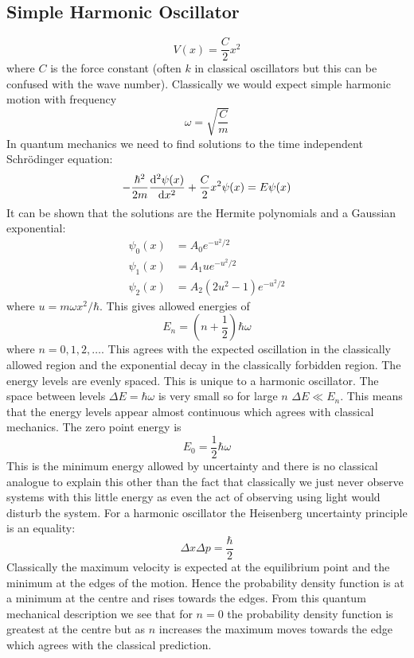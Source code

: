 \documentclass{article}
\begin{document}
    \subsection{Simple Harmonic Oscillator}
    \[V(x) = \frac{C}{2}x^2\]
    where \(C\) is the force constant (often \(k\) in classical oscillators but this can be confused with the wave number).
    Classically we would expect simple harmonic motion with frequency
    \[\omega = \sqrt{\frac{C}{m}}\]
    In quantum mechanics we need to find solutions to the time independent Schr\"odinger equation:
    \[-\frac{\hbar^2}{2m}\dv[2]{\psi(x)}{x} + \frac{C}{2}x^2\psi(x) = E\psi(x)\]
    It can be shown that the solutions are the Hermite polynomials and a Gaussian exponential:
    \begin{align*}
        \psi_0(x) &= A_0 e^{-u^2/2}\\
        \psi_1(x) &= A_1 u e^{-u^2/2}\\
        \psi_2(x) &= A_2 (2u^2 - 1) e^{-u^2/2}
    \end{align*}
    where \(u = m\omega x^2 / \hbar\).
    This gives allowed energies of
    \[E_n = \left(n + \frac{1}{2}\right)\hbar \omega\]
    where \(n = 0, 1, 2,\dotsc\).
    This agrees with the expected oscillation in the classically allowed region and the exponential decay in the classically forbidden region.
    The energy levels are evenly spaced.
    This is unique to a harmonic oscillator.
    The space between levels \(\Delta E = \hbar\omega\) is very small so for large \(n\) \(\Delta E \ll E_n\).
    This means that the energy levels appear almost continuous which agrees with classical mechanics.
    The zero point energy is
    \[E_0 = \frac{1}{2}\hbar \omega\]
    This is the minimum energy allowed by uncertainty and there is no classical analogue to explain this other than the fact that classically we just never observe systems with this little energy as even the act of observing using light would disturb the system.
    For a harmonic oscillator the Heisenberg uncertainty principle is an equality:
    \[\Delta x \Delta p = \frac{\hbar}{2}\]
    Classically the maximum velocity is expected at the equilibrium point and the minimum at the edges of the motion.
    Hence the probability density function is at a minimum at the centre and rises towards the edges.
    From this quantum mechanical description we see that for \(n = 0\) the probability density function is greatest at the centre but as \(n\) increases the maximum moves towards the edge which agrees with the classical prediction.
\end{document}
